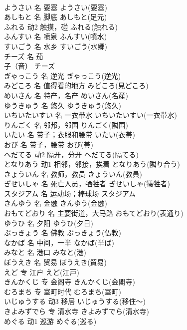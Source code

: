 \documentclass[8pt]{extreport}
\begin{document}
\begin{CJK}{UTF8}{min}
\\	ようさい	名	要塞	ようさい(要塞)	
\\	あしもと	名	脚底	あしもと(足元)	
\\	ふれる	动2	触摸，碰	ふれる(触れる)	
\\	ふんすい	名	喷泉	ふんすい(噴水)	
\\	すいごう	名	水乡	すいごう(水郷)	
\\	チーズ	名	茄
\\	子（音）	チーズ	
\\	ぎゃっこう	名	逆光	ぎゃっこう(逆光)	
\\	みどころ	名	值得看的地方	みどころ(見どころ)	
\\	めいさん	名	特产，名产	めいさん(名産)	
\\	ゆうきゅう	名	悠久	ゆうきゅう(悠久)	
\\	いちいたいすい	名	一衣带水	いちいたいすい(一衣帯水)	
\\	りんごく	名	邻邦，邻国	りんごく(隣国)	
\\	いたい	名	带子；衣服和腰带	いたい(衣帯)	
\\	おび	名	带子，腰带	おび(帯)	
\\	へだてる	动2	隔开，分开	へだてる(隔てる)	
\\	となりあう	动1	相邻，邻接，挨着	となりあう(隣り合う)	
\\	きょういん	名	教师，教员	きょういん(教員)	
\\	ぎせいしゃ	名	死亡人员，牺牲者	ぎせいしゃ(犠牲者)	
\\	スタジアム	名	运动场；棒球场	スタジアム	
\\	きんゆう	名	金融	きんゆう(金融)	
\\	おもてどおり	名	主要街道，大马路	おもてどおり(表通り)	
\\	ゆうひ	名	夕阳	ゆうひ(夕日)	
\\	ぶっきょう	名	佛教	ぶっきょう(仏教)	
\\	なかば	名	中间，一半	なかば(半ば)	
\\	みなと	名	港口	みなと(港)	
\\	ぼうえき	名	贸易	ぼうえき(貿易)	
\\	えど	专	江户	えど(江戸)	
\\	きんかくじ	专	金阁寺	きんかくじ(金閣寺)	
\\	むろまち	专	室町时代	むろまち(室町)	
\\	いじゅうする	动3	移居	いじゅうする(移住～)	
\\	きよみずでら	专	清水寺	きよみずでら(清水寺)	
\\	めぐる	动1	巡游	めぐる(巡る)	

\end{CJK}
\end{document}
